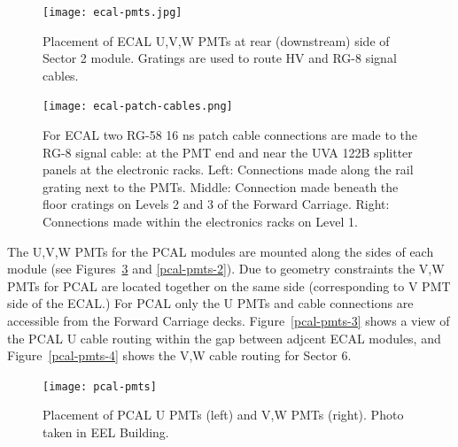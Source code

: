 \documentclass[letterpaper,10pt]{article}
\begin{document}
\begin{figure}[htbp]
  \centering
  \texttt{[image: ecal-pmts.jpg]}
  \vspace{2mm}
  \caption{Placement of ECAL U,V,W PMTs at rear (downstream) side of Sector 2 module.  Gratings are
  used to route HV and RG-8 signal cables.}
\label{ecal-pmts}
\end{figure}


\begin{figure}[htbp]
  \centering
  \texttt{[image: ecal-patch-cables.png]}
  \vspace{2mm}
  \caption{For ECAL two RG-58 16 ns patch cable connections are made to the RG-8 signal cable: at the PMT
    end and near the UVA 122B splitter panels at the electronic racks.  Left: Connections
    made along the rail grating next to the PMTs.  Middle: Connection made beneath the floor cratings on
    Levels 2 and 3 of the Forward Carriage.  Right: Connections made within the electronics racks on Level 1.}
\label{ecal-patch-cables}
\end{figure}

The U,V,W PMTs for the PCAL modules are mounted along the sides of each module
(see Figures~\ref{pcal-pmts} and \ref{pcal-pmts-2}).  Due to geometry constraints the V,W PMTs for PCAL are located
together on the same side (corresponding to V PMT side of the ECAL.)  For PCAL only the U PMTs and cable connections
are accessible from the Forward Carriage decks.  Figure~\ref{pcal-pmts-3} shows a view of the PCAL U cable routing
within the gap between adjcent ECAL modules, and Figure~\ref{pcal-pmts-4} shows the V,W cable routing for Sector 6.


\begin{figure}[htbp]
  \centering
  \texttt{[image: pcal-pmts]}
  \vspace{2mm}
  \caption{Placement of PCAL U PMTs (left) and V,W PMTs (right).  Photo taken in EEL Building. }
\label{pcal-pmts}
\end{figure}
\end{document}
